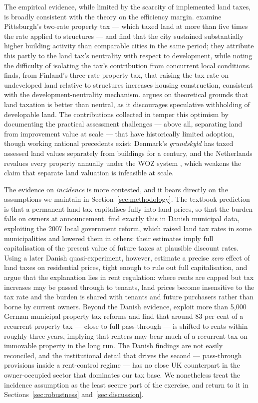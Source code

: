 The empirical evidence, while limited by the scarcity of implemented land taxes, is broadly consistent with the theory on the efficiency margin. \citet{oates1997} examine Pittsburgh's two-rate property tax --- which taxed land at more than five times the rate applied to structures --- and find that the city sustained substantially higher building activity than comparable cities in the same period; they attribute this partly to the land tax's neutrality with respect to development, while noting the difficulty of isolating the tax's contribution from concurrent local conditions. \citet{lyytikainen2009} finds, from Finland's three-rate property tax, that raising the tax rate on undeveloped land relative to structures increases housing construction, consistent with the development-neutrality mechanism. \citet{tideman1995} argues on theoretical grounds that land taxation is better than neutral, as it discourages speculative withholding of developable land. The contributions collected in \citet{dye2009} temper this optimism by documenting the practical assessment challenges --- above all, separating land from improvement value at scale --- that have historically limited adoption, though working national precedents exist: Denmark's \emph{grundskyld} has taxed assessed land values separately from buildings for a century, and the Netherlands revalues every property annually under the WOZ system \citep{oecd2022}, which weakens the claim that separate land valuation is infeasible at scale.

The evidence on \emph{incidence} is more contested, and it bears directly on the assumptions we maintain in Section~\ref{sec:methodology}. The textbook prediction is that a permanent land tax capitalises fully into land prices, so that the burden falls on owners at announcement. \citet{hoj2018} find exactly this in Danish municipal data, exploiting the 2007 local government reform, which raised land tax rates in some municipalities and lowered them in others: their estimates imply full capitalisation of the present value of future taxes at plausible discount rates. Using a later Danish quasi-experiment, however, \citet{nielsson2024} estimate a precise \emph{zero} effect of land taxes on residential prices, tight enough to rule out full capitalisation, and argue that the explanation lies in rent regulation: where rents are capped but tax increases may be passed through to tenants, land prices become insensitive to the tax rate and the burden is shared with tenants and future purchasers rather than borne by current owners. Beyond the Danish evidence, \citet{loeffler2024} exploit more than 5,000 German municipal property tax reforms and find that around 83 per cent of a recurrent property tax --- close to full pass-through --- is shifted to rents within roughly three years, implying that renters may bear much of a recurrent tax on immovable property in the long run. The Danish findings are not easily reconciled, and the institutional detail that drives the second --- pass-through provisions inside a rent-control regime --- has no close UK counterpart in the owner-occupied sector that dominates our tax base. We nonetheless treat the incidence assumption as the least secure part of the exercise, and return to it in Sections~\ref{sec:robustness} and~\ref{sec:discussion}.

